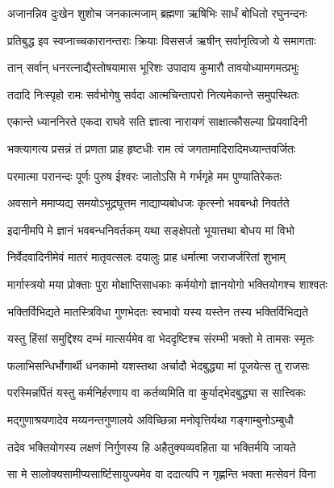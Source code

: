\twolineshloka
{अजानन्निव दुःखेन शुशोच जनकात्मजाम्}
{ब्रह्मणा ऋषिभिः सार्धं बोधितो रघुनन्दनः} %

\twolineshloka
{प्रतिबुद्ध इव स्वप्नाच्चकारानन्तराः क्रियाः}
{विससर्ज ऋषीन् सर्वानृत्विजो ये समागताः} %

\twolineshloka
{तान् सर्वान् धनरत्नाद्यैस्तोषयामास भूरिशः}
{उपादाय कुमारौ तावयोध्यामगमत्प्रभुः} %

\twolineshloka
{तदादि निःस्पृहो रामः सर्वभोगेषु सर्वदा}
{आत्मचिन्तापरो नित्यमेकान्ते समुपस्थितः} %

\twolineshloka
{एकान्ते ध्याननिरते एकदा राघवे सति}
{ज्ञात्वा नारायणं साक्षात्कौसल्या प्रियवादिनी} %

\twolineshloka
{भक्त्यागत्य प्रसन्नं तं प्रणता प्राह हृष्टधीः}
{राम त्वं जगतामादिरादिमध्यान्तवर्जितः} %

\twolineshloka
{परमात्मा परानन्दः पूर्णः पुरुष ईश्वरः}
{जातोऽसि मे गर्भगृहे मम पुण्यातिरेकतः} %

\twolineshloka
{अवसाने ममाप्यद्य समयोऽभूद्रघूत्तम}
{नाद्याप्यबोधजः कृत्स्नो भवबन्धो निवर्तते} %

\twolineshloka
{इदानीमपि मे ज्ञानं भवबन्धनिवर्तकम्}
{यथा सङ्क्षेपतो भूयात्तथा बोधय मां विभो} %

\twolineshloka
{निर्वेदवादिनीमेवं मातरं मातृवत्सलः}
{दयालुः प्राह धर्मात्मा जराजर्जरितां शुभाम्} %

\twolineshloka
{मार्गास्त्रयो मया प्रोक्ताः पुरा मोक्षाप्तिसाधकाः}
{कर्मयोगो ज्ञानयोगो भक्तियोगश्च शाश्वतः} %

\twolineshloka
{भक्तिर्विभिद्यते मातस्त्रिविधा गुणभेदतः}
{स्वभावो यस्य यस्तेन तस्य भक्तिर्विभिद्यते} %

\twolineshloka
{यस्तु हिंसां समुद्दिश्य दम्भं मात्सर्यमेव वा}
{भेददृष्टिश्च संरम्भी भक्तो मे तामसः स्मृतः} %

\twolineshloka
{फलाभिसन्धिर्भोगार्थी धनकामो यशस्तथा}
{अर्चादौ भेदबुद्ध्या मां पूजयेत्स तु राजसः} %

\twolineshloka
{परस्मिन्नर्पितं यस्तु कर्मनिर्हरणाय वा}
{कर्तव्यमिति वा कुर्याद्भेदबुद्ध्या स सात्त्विकः} %

\twolineshloka
{मद्गुणाश्रयणादेव मय्यनन्तगुणालये}
{अविच्छिन्ना मनोवृत्तिर्यथा गङ्गाम्बुनोऽम्बुधौ} %

\twolineshloka
{तदेव भक्तियोगस्य लक्षणं निर्गुणस्य हि}
{अहैतुक्यव्यवहिता या भक्तिर्मयि जायते} %

\twolineshloka
{सा मे सालोक्यसामीप्यसार्ष्टिसायुज्यमेव वा}
{ददात्यपि न गृह्णन्ति भक्ता मत्सेवनं विना} %

